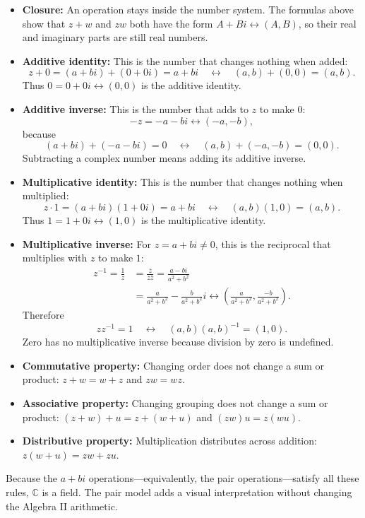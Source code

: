 \documentclass[12pt]{article}
\begin{document}
\begin{itemize}[leftmargin=1.5em,itemsep=0.4em]
  \item \textbf{Closure:} An operation stays inside the number system. The formulas above show that $z+w$ and $zw$ both have the form $A+Bi\longleftrightarrow(A,B)$, so their real and imaginary parts are still real numbers.

  \item \textbf{Additive identity:} This is the number that changes nothing when added:
  \[
    z+0=(a+bi)+(0+0i)=a+bi
    \quad\longleftrightarrow\quad
    (a,b)+(0,0)=(a,b).
  \]
  Thus $0=0+0i\longleftrightarrow(0,0)$ is the additive identity.

  \item \textbf{Additive inverse:} This is the number that adds to $z$ to make $0$:
  \[
    -z=-a-bi\longleftrightarrow(-a,-b),
  \]
  because
  \[
    (a+bi)+(-a-bi)=0
    \quad\longleftrightarrow\quad
    (a,b)+(-a,-b)=(0,0).
  \]
  Subtracting a complex number means adding its additive inverse.

  \item \textbf{Multiplicative identity:} This is the number that changes nothing when multiplied:
  \[
    z\cdot1=(a+bi)(1+0i)=a+bi
    \quad\longleftrightarrow\quad
    (a,b)(1,0)=(a,b).
  \]
  Thus $1=1+0i\longleftrightarrow(1,0)$ is the multiplicative identity.

  \item \textbf{Multiplicative inverse:} For $z=a+bi\ne0$, this is the reciprocal that multiplies with $z$ to make $1$:
  \[
  \begin{aligned}
    z^{-1}=\frac1z
      &=\frac{\overline z}{z\overline z}
       =\frac{a-bi}{a^2+b^2}\\
      &=\frac{a}{a^2+b^2}-\frac{b}{a^2+b^2}i
       \longleftrightarrow
       \left(\frac{a}{a^2+b^2},\frac{-b}{a^2+b^2}\right).
  \end{aligned}
  \]
  Therefore
  \[
    zz^{-1}=1
    \quad\longleftrightarrow\quad
    (a,b)(a,b)^{-1}=(1,0).
  \]
  Zero has no multiplicative inverse because division by zero is undefined.

  \item \textbf{Commutative property:} Changing order does not change a sum or product: $z+w=w+z$ and $zw=wz$.

  \item \textbf{Associative property:} Changing grouping does not change a sum or product: $(z+w)+u=z+(w+u)$ and $(zw)u=z(wu)$.

  \item \textbf{Distributive property:} Multiplication distributes across addition: $z(w+u)=zw+zu$.
\end{itemize}
Because the $a+bi$ operations---equivalently, the pair operations---satisfy all these rules, $\mathbb C$ is a field. The pair model adds a visual interpretation without changing the Algebra II arithmetic.
\end{document}
